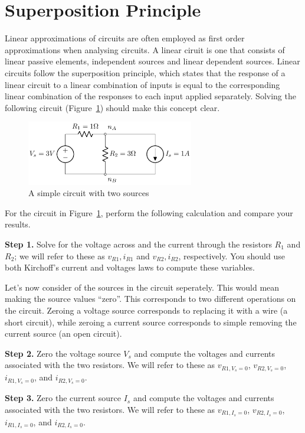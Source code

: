 \section{Superposition Principle}
Linear approximations of circuits are often employed as first order approximations when analysing circuits. A linear ciruit is one that consists of linear passive elements, independent sources and linear dependent sources. Linear circuits follow the superposition principle, which states that the response of a linear circuit to a linear combination of inputs is equal to the corresponding linear combination of the responses to each input applied separately. Solving the following circuit (Figure~\ref{fig:02-03}) should make this concept clear.
\begin{figure}[t]
    \centering
    \includegraphics[width=0.65\textwidth]{figure/ch02/fig02-03.pdf}
    \caption{A simple circuit with two sources}
    \label{fig:02-03}
\end{figure}
For the circuit in Figure~\ref{fig:02-03}, perform the following calculation and compare your results.

\noindent\textbf{Step 1.} Solve for the voltage across and the current through the resistors $R_1$ and $R_2$; we will refer to these as $v_{R1}, i_{R1}$ and $v_{R2}, i_{R2}$, respectively. You should use both Kirchoff's current and voltages laws to compute these variables.

\noindent Let's now consider of the sources in the circuit seperately. This would mean making the source values ``zero''. This corresponds to two different operations on the circuit. Zeroing a voltage source corresponds to replacing it with a wire (a short circuit), while zeroing a current source corresponds to simple removing the current source (an open circuit). 

\noindent\textbf{Step 2.} Zero the voltage source $V_s$ and compute the voltages and currents associated with the two resistors. We will refer to these as $v_{R1,V_s=0}$, $v_{R2,V_s=0}$, $i_{R1,V_s=0}$, and $i_{R2,V_s=0}$.

\noindent\textbf{Step 3.} Zero the current source $I_s$ and compute the voltages and currents associated with the two resistors. We will refer to these as $v_{R1,I_s=0}$, $v_{R2,I_s=0}$, $i_{R1,I_s=0}$, and $i_{R2,I_s=0}$.

